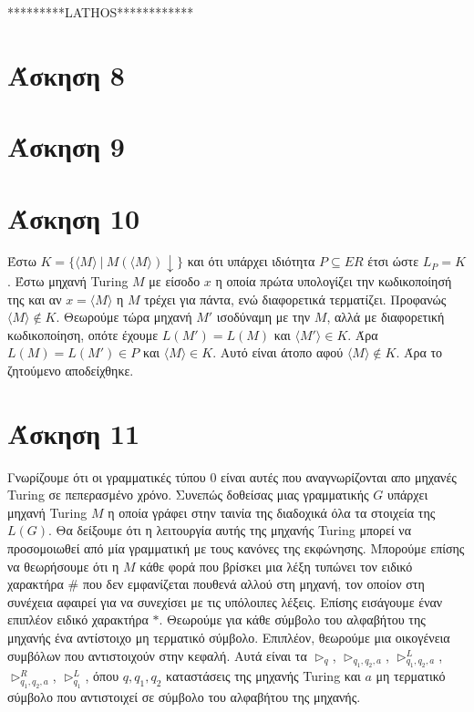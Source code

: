 \documentclass[a4paper, oneside, 11pt]{article}
\theoremstyle{definition}
\begin{document}
*********LATHOS************


\section*{Άσκηση 8}
\section*{Άσκηση 9}
\section*{Άσκηση 10}
Έστω $K=\{\langle M\rangle\ |\ M(\langle M\rangle)\downarrow \}$ και ότι υπάρχει ιδιότητα $P\subseteq ER$ έτσι ώστε $L_P = K$. Έστω μηχανή Turing $Μ$ με είσοδο $x$
η οποία πρώτα υπολογίζει την κωδικοποίησή της και αν $x=\langle M\rangle$ η $M$ τρέχει για πάντα, ενώ διαφορετικά τερματίζει. Προφανώς $\langle M\rangle\notin K$.
Θεωρούμε τώρα μηχανή $M'$ ισοδύναμη με την $M$, αλλά με διαφορετική κωδικοποίηση, οπότε έχουμε $L(M')=L(M)$ και $\langle M'\rangle \in K$. 
Άρα $L(M)=L(M')\in P$ και $\langle M\rangle \in K$. 
Αυτό είναι
άτοπο αφού $\langle M\rangle\notin K$. Άρα το ζητούμενο αποδείχθηκε.

\section*{Άσκηση 11}
Γνωρίζουμε ότι οι γραμματικές τύπου $0$ είναι αυτές που αναγνωρίζονται απο μηχανές Turing σε πεπερασμένο χρόνο. Συνεπώς δοθείσας μιας γραμματικής $G$ υπάρχει μηχανή Turing
$M$ η οποία γράφει στην ταινία της διαδοχικά όλα τα στοιχεία της $L(G)$. Θα δείξουμε ότι η λειτουργία αυτής της μηχανής Turing μπορεί να προσομοιωθεί από μία γραμματική
με τους κανόνες της εκφώνησης. Μπορούμε επίσης να θεωρήσουμε ότι η $M$ κάθε φορά που βρίσκει μια λέξη τυπώνει τον ειδικό χαρακτήρα $\#$ που δεν εμφανίζεται πουθενά αλλού στη
μηχανή, τον οποίον στη συνέχεια αφαιρεί για να
συνεχίσει με τις υπόλοιπες λέξεις. Επίσης εισάγουμε έναν επιπλέον ειδικό χαρακτήρα $*$. 
Θεωρούμε για κάθε σύμβολο του αλφαβήτου της μηχανής ένα αντίστοιχο μη τερματικό σύμβολο. Επιπλέον, θεωρούμε μια οικογένεια συμβόλων που
αντιστοιχούν στην κεφαλή. Αυτά είναι τα $\triangleright_q$, $\triangleright_{q_1,q_2,a}$, $\triangleright_{q_1,q_2,a}^L$, $\triangleright_{q_1,q_2,a}^R$, $\triangleright_{q_1}^L$, όπου $q,q_1,q_2$
καταστάσεις της μηχανής Turing και $a$ μη τερματικό σύμβολο που αντιστοιχεί σε σύμβολο του αλφαβήτου της μηχανής.
\end{document}
